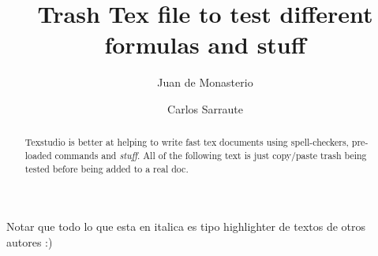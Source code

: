 \documentclass{article}%
\newcommand{\Expect}{{\mathbb{E}}}
\newtheorem{definition}{Definition}[subsection]
\theoremstyle{definition}
\begin{document}

\title{Trash Tex file to test different formulas and stuff}




\author{
	Juan de Monasterio
	\and Carlos Sarraute
}

%
%


\maketitle
\begin{abstract}
	
	Texstudio is better at helping to write fast tex documents using spell-checkers, pre-loaded commands and \textit{stuff}. All of the following text is just copy/paste trash being tested before being added to a real doc.
	



	
	
\end{abstract} 

Notar que todo lo que esta en italica es tipo highlighter de textos de otros autores :)
\end{document}
